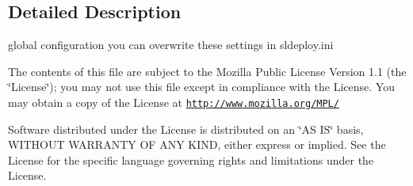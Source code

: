\subsection{Detailed Description}
global configuration you can overwrite these settings in sldeploy.ini

The contents of this file are subject to the Mozilla Public License Version 1.1 (the \char`\"{}License\char`\"{}); you may not use this file except in compliance with the License. You may obtain a copy of the License at \href{http://www.mozilla.org/MPL/}{\tt http://www.mozilla.org/MPL/}

Software distributed under the License is distributed on an \char`\"{}AS IS\char`\"{} basis, WITHOUT WARRANTY OF ANY KIND, either express or implied. See the License for the specific language governing rights and limitations under the License. 